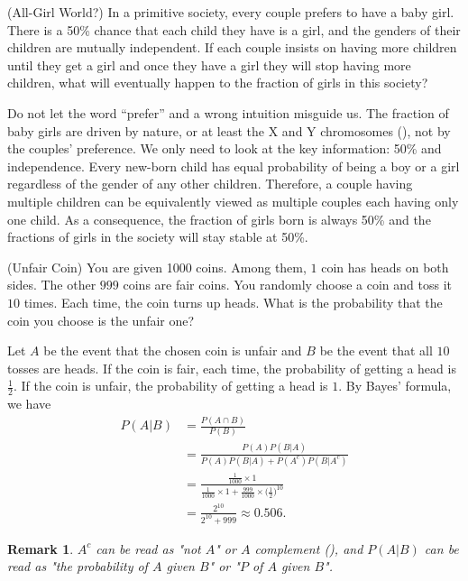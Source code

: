 \documentclass[12pt,letterpaper, onecolumn]{exam}
\newtheorem{remark}{Remark}
\begin{document}
\begin{questions}
    \question[](All-Girl World?) In a primitive society, every couple prefers to have a baby girl. There is a 50\% chance that each child they have is a girl, and the genders of their children are mutually independent. If each couple insists on having more children until they get a girl and once they have a girl they will stop having more children, what will eventually happen to the fraction of girls in this society?
    \begin{solution}
        Do not let the word “prefer” and a wrong intuition misguide us. The fraction of baby girls are driven by nature, or at least the X and Y chromosomes (), not by the couples’ preference. We only need to look at the key information: 50\% and independence. Every new-born child has equal probability of being a boy or a girl regardless of the gender of any other children. Therefore, a couple having multiple children can be equivalently viewed as multiple couples each having only one child. As a consequence, the fraction of girls born is always 50\% and the fractions of girls in the society will stay stable at 50\%.
    \end{solution}

    \question[](Unfair Coin) You are given 1000 coins. Among them, $1$ coin has heads on both sides. The other $999$ coins are fair coins. You randomly choose a coin and toss it $10$ times. Each time, the coin turns up heads. What is the probability that the coin you choose is the unfair one?

    \begin{solution}
        Let $A$ be the event that the chosen coin is unfair and $B$ be the event that all $10$ tosses are heads. If the coin is fair, each time, the probability of getting a head is $\frac{1}{2}$. If the coin is unfair, the probability of getting a head is $1$. By Bayes' formula, we have
        \begin{align*}
            P(A|B)&=\frac{P(A\cap B)}{P(B)}\\
            &=\frac{P(A)P(B|A)}{P(A)P(B|A)+P(A^c)P(B|A^c)}\\
            &=\frac{\frac{1}{1000}\times 1}{\frac{1}{1000}\times 1+\frac{999}{1000}\times\Big(\frac{1}{2}\Big)^{10}}\\
            &=\frac{2^{10}}{2^{10}+999}\approx 0.506.
        \end{align*}
    \end{solution}
    \begin{remark}
        $A^c$ can be read as "not $A$" or $A$ complement (), and $P(A|B)$ can be read as "the probability of $A$ given $B$" or "$P$ of $A$ given $B$".
    \end{remark}


\end{questions}
\end{document}

